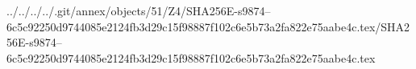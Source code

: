 ../../../../.git/annex/objects/51/Z4/SHA256E-s9874--6c5c92250d9744085e2124fb3d29c15f98887f102c6e5b73a2fa822e75aabe4c.tex/SHA256E-s9874--6c5c92250d9744085e2124fb3d29c15f98887f102c6e5b73a2fa822e75aabe4c.tex
